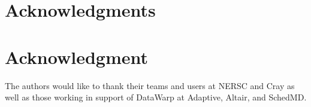 \documentclass[10pt, conference, compsocconf]{IEEEtran}
\begin{document}
\ifCLASSOPTIONcompsoc
  \section*{Acknowledgments}
\else
  \section*{Acknowledgment}
\fi

The authors would like to thank their teams and users at NERSC and Cray as well as those working in support of DataWarp at Adaptive, Altair, and SchedMD.









%

\end{document}
